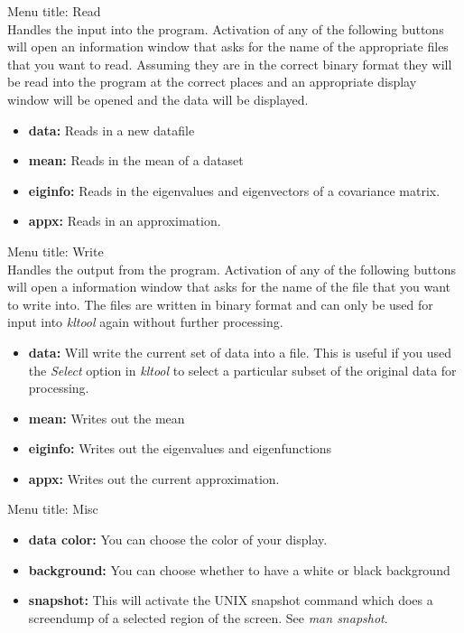 \begin{description}
\item{Menu title: {\large  Read}}\\
Handles the input into the program. Activation of any of the following buttons
will open an information window that asks for the name of the appropriate files
that you want to read. Assuming they are in the correct binary format they will be 
read into the program at the correct places and  an appropriate display window
will be opened and the data will be displayed. 
\begin{itemize}
\item{\bf data:} 
	Reads in a new datafile	
\item{\bf mean:} 
	Reads in the mean of a dataset
\item{\bf eiginfo:} 
	Reads in the eigenvalues and eigenvectors of a covariance matrix.
\item{\bf appx:} 
	Reads in an approximation.
\end{itemize}
\item{Menu title: {\large  Write}}\\
Handles the output from the program. Activation of any of the following buttons
will open a information window that asks for the name of the file that you want 
to write into. The files are written in binary format and can only be used 
for input into {\sl kltool} again without further processing. 
\begin{itemize}
\item{\bf data:} 
	 Will write the current set of data into a file. This is useful
if you used the {\sl Select} option in {\sl kltool} to select a particular
subset of the original data for processing.
\item{\bf mean:}  
	Writes out the mean
\item{\bf eiginfo:} 
	Writes out the eigenvalues and eigenfunctions
\item{\bf appx:} 
	Writes out the current approximation.
\end{itemize}

\item{Menu title: {\large  Misc}}
\begin{itemize}
\item{\bf data color:} 
	You can choose the color of your display.
\item{\bf background:} 
	You can choose whether to have a white or black background
\item{\bf snapshot:} This will activate the UNIX snapshot command which
does a screendump of a selected region of the screen. See {\em man snapshot}.
\end{itemize}
\end{description}

